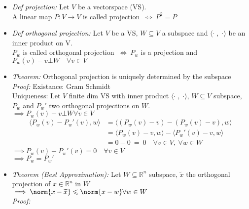
\begin{SolutionSheet}[\ref{sheet1}]

  \begin{Solution}
    \begin{itemize}
      \item \textit{Def projection:} Let $V$ be a vectorspace (VS). \\
        A linear map $P: V \to V$ is called projection $\ \iff \ P^2 = P$
      \item \textit{Def orthogonal projection:} Let $V$ be a VS, $W \subseteq V$ a subspace 
        and $\langle \cdot \; , \; \cdot \rangle$ be an inner product on V. \\
        $P_w$ is called orthogonal projection $\ \iff \ P_w$ is a projection and 
        $P_w(v)-v \bot W \quad \forall v\in V$
      \item \textit{Theorem:} Orthogonal projection is uniquely determined by the subspace \\
        \textit{Proof:} Existance: Gram Schmidt \\
        Uniqueness: Let $V$ finite dim VS with inner product $\langle \cdot \; , \; \cdot \rangle$,
        $W \subseteq V$ subspace, $P_w$ and $P_w'$ two orthogonal projections on $W$. \\
        $\implies P_w(v)-v \bot W \forall v \in V$ 
        \begin{align*}
          \langle P_w(v) - P_w'(v), w \rangle &= \langle (P_w(v) - v) - (P_w(v) - v), w \rangle \\
          &= \langle P_w(v) - v , w \rangle - \langle P_w'(v) - v , w \rangle \\
          &= 0 - 0 \ = \ 0 \quad \forall v\in V, \ \forall w\in W
        \end{align*}
        $\implies P_w(v) - P_w'(v) = 0 \quad \forall v \in V$ \\
        $\implies P_w = P_w'$
      \item \textit{Theorem (Best Approximation):} Let $W \subseteq \mathbb{R}^n$ subspace,
        $\widetilde{x}$ the orthogonal projection of $x \in \mathbb{R}^n$ in $W$ \\
        $\implies \norm{x - \widetilde{x}} \leqslant \norm{x - w} \forall w \in W$ \\
        \textit{Proof:}  
        \begin{align*}

\end{align*}
\end{itemize}
\end{Solution}
\end{SolutionSheet}
